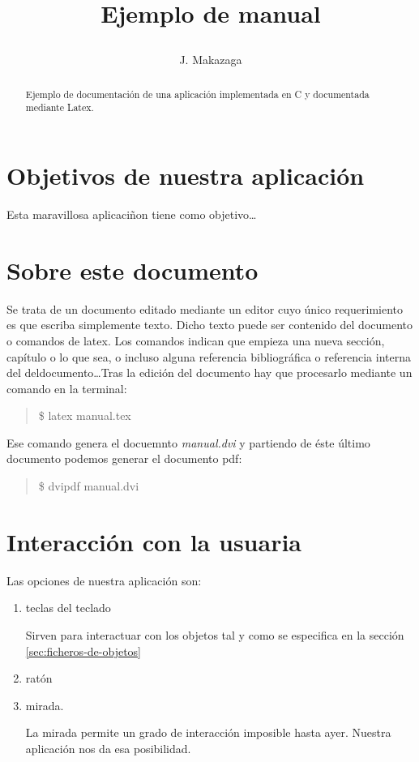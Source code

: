 \documentclass[12pt,a4paper]{article}
\begin{document}
\title{\begin{center}
\end{center}
\vspace{1cm}
Ejemplo de manual}

\author{J. Makazaga}

\maketitle
\begin{abstract}
Ejemplo de documentación de una aplicación implementada en C y documentada mediante Latex.

\end{abstract}

\section{Objetivos de nuestra aplicación}

Esta maravillosa aplicaciñon tiene como objetivo\ldots

\section{Sobre este documento}

Se trata de un documento editado mediante un editor cuyo único requerimiento es que escriba simplemente texto. Dicho texto puede ser contenido del documento o comandos de latex. Los comandos indican que empieza una nueva sección, capítulo o lo que sea, o incluso alguna referencia bibliográfica o referencia interna del deldocumento\ldots Tras la edición del documento hay que procesarlo mediante un comando en la terminal:
\begin{verse}
\$ latex manual.tex
\end{verse}
Ese comando genera el docuemnto \emph{manual.dvi} y partiendo de éste último documento podemos generar el documento pdf:
\begin{verse}
\$ dvipdf manual.dvi
\end{verse}

\section{Interacción con la usuaria}
Las opciones de nuestra aplicación son: 
\begin{enumerate}
\item teclas del teclado

Sirven para interactuar con los objetos tal y como se especifica en la sección \ref{sec:ficheros-de-objetos}

\item ratón
\item mirada. 

La mirada permite un grado de interacción imposible hasta ayer. Nuestra aplicación nos da esa posibilidad.
\end{enumerate}
\end{document}
